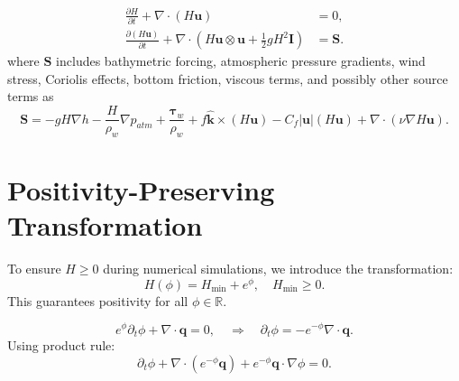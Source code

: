\documentclass[11pt]{article}
\begin{document}

\begin{equation}
\boxed{
\begin{aligned}
\frac{\partial H}{\partial t} + \nabla \cdot (H\bm{u}) &= 0, \\
\frac{\partial (H\bm{u})}{\partial t}
+
\nabla \cdot
\left(
H\bm{u}\otimes\bm{u}
+
\frac{1}{2} g H^2 \bm{I}
\right)
&=
\bm{S}.
\end{aligned}
}
\end{equation}
where \(\bm{S}\) includes bathymetric forcing, atmospheric pressure gradients, wind stress, Coriolis effects, bottom friction, viscous terms, and possibly other source terms as
\begin{equation}
\bm{S}
=
- g H \nabla h
- \frac{H}{\rho_w} \nabla p_{atm}
+ \frac{\bm{\tau}_w}{\rho_w}
+ f \hat{\bm{k}} \times (H\bm{u})
- C_f |\bm{u}| (H\bm{u})
+ \nabla \cdot (\nu  \nabla H \bm{u}).
\end{equation}


\section{Positivity-Preserving Transformation}

To ensure $H \ge 0$ during numerical simulations, we introduce the transformation:
\[
H(\phi) = H_{\min} + e^{\phi}, \quad H_{\min} \ge 0.
\]
This guarantees positivity for all $\phi \in \mathbb{R}$.


\[
e^{\phi} \partial_t \phi + \nabla \cdot \mathbf{q} = 0,
\quad
\Rightarrow
\quad
\partial_t \phi = - e^{-\phi} \nabla \cdot \mathbf{q}.
\]
Using product rule:
\[
\partial_t \phi
+
\nabla \cdot (e^{-\phi} \mathbf{q})
+
e^{-\phi} \mathbf{q} \cdot \nabla \phi
= 0.
\]
\end{document}

